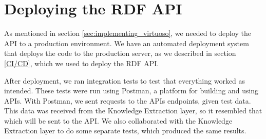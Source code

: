 \section{Deploying the RDF API}
As mentioned in section \ref{sec:implementing_virtuoso}, we needed to deploy the API to a production environment.
We have an automated deployment system that deploys the code to the production server, as we described in section \ref{CI/CD}, which we used to deploy the RDF API.

After deployment, we ran integration tests to test that everything worked as intended. These tests were run using Postman, a platform for building and using APIs\cite{PostmanAPIPlatform}. With Postman, we sent requests to the APIs endpoints, given \knox{} test data. This data was received from the Knowledge Extraction layer, so it resembled that which will be sent to the API.
We also collaborated with the Knowledge Extraction layer to do some separate tests, which produced the same results.
